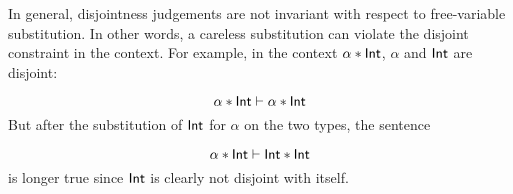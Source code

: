 %
%

In general, disjointness judgements are not invariant with respect to
free-variable substitution. In other words, a careless substitution can violate
the disjoint constraint in the context. For example, in the context $\alpha
* \textsf{Int}$, $\alpha$ and $\textsf{Int}$ are disjoint:

\[
  \alpha * \textsf{Int} \vdash \alpha * \textsf{Int}
\]
But after the substitution of $\textsf{Int}$ for $\alpha$ on the two types, the sentence

\[
  \alpha * \textsf{Int} \vdash \textsf{Int} * \textsf{Int}
\]
is longer true since $\textsf{Int}$ is clearly not disjoint with itself.

